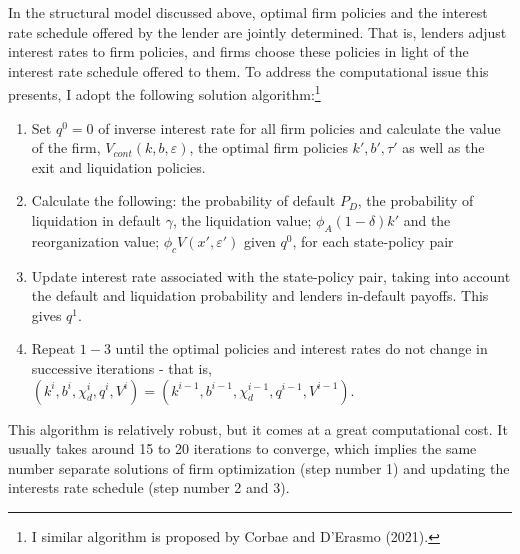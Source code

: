 \documentclass[12pt]{article}
\begin{document}
In the structural model discussed above, optimal firm policies and the interest rate schedule offered by the lender are jointly determined. That is, lenders adjust interest rates to firm policies, and firms choose these policies in light of the interest rate schedule offered to them. To address the computational issue this presents, I adopt the following solution algorithm:\footnote{I similar algorithm is proposed by Corbae and D'Erasmo (2021).}
\begin{enumerate}
    \item Set $q^0 = 0$ of inverse interest rate for all firm policies and calculate the value of the firm, $V_{cont}(k,b,\varepsilon)$, the optimal firm policies $k', b', \tau'$ as well as the exit and liquidation policies. 
    \item Calculate the following: the probability of default $P_D$, the probability of liquidation in default $\gamma$, the liquidation value; $\phi_A (1-\delta) k'$ and the reorganization value; $\phi_c V (x', \varepsilon')$ given $q^0$, for each state-policy pair
    \item Update interest rate associated with the state-policy pair, taking into account the default and liquidation probability and lenders in-default payoffs. This gives $q^1$. 
    \item Repeat $1-3$ until the optimal policies and interest rates do not change in successive iterations - that is, $ (k^{i},b^{i},\chi_d^{i},q^{i}, V^{i}) = (k^{i-1},b^{i-1},\chi_d^{i-1}, q^{i-1}, V^{i-1}) $.
\end{enumerate}
This algorithm is relatively robust, but it comes at a great computational cost. It usually takes around 15 to 20 iterations to converge, which implies the same number separate solutions of firm optimization (step number 1) and updating the interests rate schedule (step number 2 and 3). 
\end{document}
